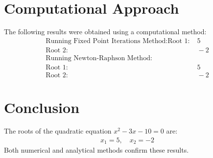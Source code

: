 \documentclass[journal]{IEEEtran}
\begin{document}
\section*{Computational Approach}
The following results were obtained using a computational method:
\begin{align*}
\text{Running Fixed Point Iterations Method:} 
\text{Root 1:} & \; 5 \\
\text{Root 2:} & \; -2 \\
\text{Running Newton-Raphson Method:} & \\
\text{Root 1:} & \; 5 \\
\text{Root 2:} & \; -2
\end{align*}


\section*{Conclusion}
The roots of the quadratic equation \( x^2 - 3x - 10 = 0 \) are:
\begin{align}
    x_1 = 5, \quad x_2 = -2
\end{align}
Both numerical and analytical methods confirm these results.
\end{document}
